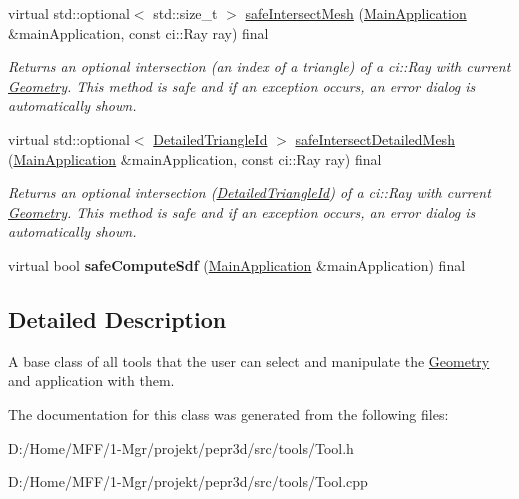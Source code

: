\begin{DoxyCompactItemize}
\mbox{\label{classpepr3d_1_1_tool_a2420df1e8a95c66a882a923158084020}} 
virtual std\+::optional$<$ std\+::size\+\_\+t $>$ \mbox{\hyperlink{classpepr3d_1_1_tool_a2420df1e8a95c66a882a923158084020}{safe\+Intersect\+Mesh}} (\mbox{\hyperlink{classpepr3d_1_1_main_application}{Main\+Application}} \&main\+Application, const ci\+::\+Ray ray) final
\begin{DoxyCompactList}\small\item\em Returns an optional intersection (an index of a triangle) of a ci\+::\+Ray with current \mbox{\hyperlink{classpepr3d_1_1_geometry}{Geometry}}. This method is safe and if an exception occurs, an error dialog is automatically shown. \end{DoxyCompactList}\item 
\mbox{\label{classpepr3d_1_1_tool_a2645ac765f26cbda2ab9c818a362912f}} 
virtual std\+::optional$<$ \mbox{\hyperlink{structpepr3d_1_1_detailed_triangle_id}{Detailed\+Triangle\+Id}} $>$ \mbox{\hyperlink{classpepr3d_1_1_tool_a2645ac765f26cbda2ab9c818a362912f}{safe\+Intersect\+Detailed\+Mesh}} (\mbox{\hyperlink{classpepr3d_1_1_main_application}{Main\+Application}} \&main\+Application, const ci\+::\+Ray ray) final
\begin{DoxyCompactList}\small\item\em Returns an optional intersection (\mbox{\hyperlink{structpepr3d_1_1_detailed_triangle_id}{Detailed\+Triangle\+Id}}) of a ci\+::\+Ray with current \mbox{\hyperlink{classpepr3d_1_1_geometry}{Geometry}}. This method is safe and if an exception occurs, an error dialog is automatically shown. \end{DoxyCompactList}\item 
\mbox{\label{classpepr3d_1_1_tool_aff4584fe20f552ae3b7814ecab423768}} 
virtual bool {\bfseries safe\+Compute\+Sdf} (\mbox{\hyperlink{classpepr3d_1_1_main_application}{Main\+Application}} \&main\+Application) final
\end{DoxyCompactItemize}


\subsection{Detailed Description}
A base class of all tools that the user can select and manipulate the \mbox{\hyperlink{classpepr3d_1_1_geometry}{Geometry}} and application with them. 

The documentation for this class was generated from the following files\+:\begin{DoxyCompactItemize}
\item 
D\+:/\+Home/\+M\+F\+F/1-\/\+Mgr/projekt/pepr3d/src/tools/Tool.\+h\item 
D\+:/\+Home/\+M\+F\+F/1-\/\+Mgr/projekt/pepr3d/src/tools/Tool.\+cpp\end{DoxyCompactItemize}
